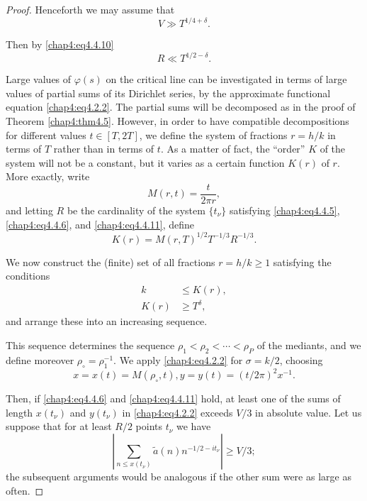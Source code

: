 \begin{proof}
Henceforth we may assume that
\begin{equation}\label{chap4:eq4.4.11}
V\gg T^{1/4+\delta}.
\end{equation}

Then by \eqref{chap4:eq4.4.10}
\begin{equation}\label{chap4:eq4.4.12}
R\ll T^{1/2-\delta}.
\end{equation}

Large values of $\varphi(s)$ on the critical line can be investigated in terms of large values of partial sums of its Dirichlet series, by the approximate functional equation \eqref{chap4:eq4.2.2}. The partial sums will be decomposed as in the proof of Theorem \ref{chap4:thm4.5}. However, in order to have compatible decompositions for different values $t\in[T,2T]$, we define the system of fractions $r=h/k$ in terms of $T$ rather than in terms of $t$. As a matter of fact, the ``order'' $K$ of the system will not be a constant, but it varies as a certain function $K(r)$ of $r$. More exactly, write
\begin{equation}\label{chap4:eq4.4.13}
M(r,t)=\frac{t}{2\pi r},
\end{equation}
and letting $R$ be the cardinality of the system $\{t_\nu\}$ satisfying \eqref{chap4:eq4.4.5}, \eqref{chap4:eq4.4.6}, and \eqref{chap4:eq4.4.11}, define
\begin{equation}\label{chap4:eq4.4.14}
K(r)=M(r,T)^{1/2}T^{-1/3}R^{-1/3}.
\end{equation}

We now construct the (finite) set of all fractions $r=h/k\geq 1$ satisfying the conditions
\begin{align}
k &\leq K(r),\label{chap4:eq4.4.15}\\
K(r) &\geq T^\delta,\label{chap4:eq4.4.16}
\end{align}\pageoriginale
and arrange these into an increasing sequence.

This sequence determines the sequence $\rho_1<\rho_2<\cdots <\rho_P$ of the mediants, and we define moreover $\rho_\circ=\rho_1^{-1}$. We apply \eqref{chap4:eq4.2.2} for $\sigma =k /2$, choosing
\begin{equation}\label{chap4:eq4.4.17}
x=x(t)=M(\rho_\circ,t),y=y(t)=(t/2\pi)^2x^{-1}.
\end{equation}

Then, if \eqref{chap4:eq4.4.6} and \eqref{chap4:eq4.4.11} hold, at least one of the sums of length $x(t_\nu)$ and $y(t_\nu)$ in \eqref{chap4:eq4.2.2} exceeds $V/3$ in absolute value. Let  us suppose that for at least $R/2$ points $t_\nu$ we have
\begin{equation}\label{chap4:eq4.4.18}
\left|\sum\limits_{n\leq x(t_\nu)}\tilde{a}(n)n^{-1/2-it_\nu}\right|\geq V/3;
\end{equation}
the subsequent arguments would be analogous if the other sum were as large as often.


\end{proof}
